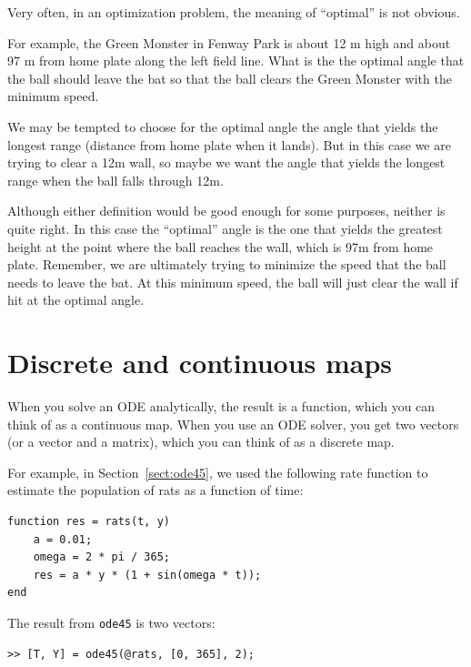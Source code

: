 \documentclass[
]{book}
\begin{document}
\begin{ex}
Very often, in an optimization problem, the meaning of ``optimal'' is not obvious.

For example, the Green Monster in Fenway Park is about 12 m high and about 97
m from home plate along the left field line.
What is the
the optimal angle that the ball should leave
the bat so that the ball clears the Green Monster with the minimum speed.

We may be tempted
to choose for the optimal angle the angle that yields the longest
range (distance from home plate when it lands).  But in this
case we are trying to clear a 12m wall, so maybe we want
the angle that yields the longest range when the ball falls
through 12m.

Although either definition would be good enough for some purposes,
neither is quite right.  In this case the ``optimal'' angle is
the one that yields the greatest height at the point where
the ball reaches the wall, which is 97m from home plate.
Remember, we are ultimately trying to minimize
the speed that the ball needs to leave the bat.  At this minimum speed,
the ball will just clear the wall if hit at the optimal angle.
\end{ex}

\section{Discrete and continuous maps}

When you solve an ODE analytically, the result is a function,
which you can think of as a continuous map.  When you use an
ODE solver, you get two vectors (or a vector and a matrix), which
you can think of as a discrete map.

For example, in Section~\ref{sect:ode45}, we used the following rate
function to estimate the population of rats as a function of time:

\begin{verbatim}
function res = rats(t, y)
    a = 0.01;
    omega = 2 * pi / 365;
    res = a * y * (1 + sin(omega * t));
end
\end{verbatim}

The result from {\tt ode45} is two vectors:

\begin{verbatim}
>> [T, Y] = ode45(@rats, [0, 365], 2);
\end{verbatim}
\end{document}
